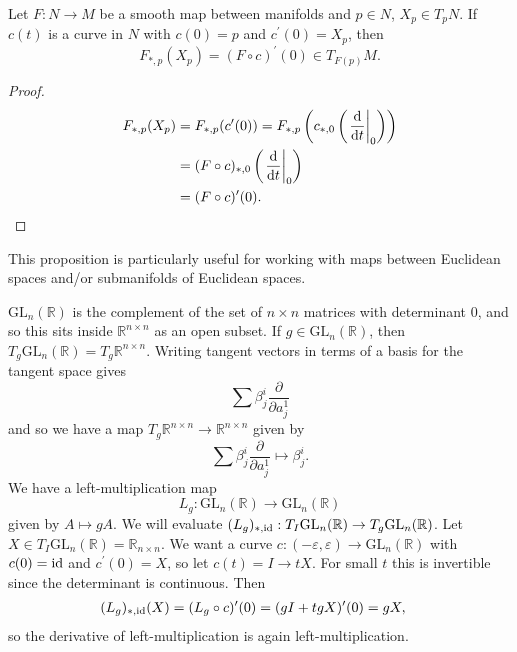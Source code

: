 \begin{prop}
Let $F: N \to M$ be a smooth map between manifolds and
$p \in N$, $X_p \in T_p N$. If $c(t)$ is a curve in $N$ with
$c(0) = p$ and $c^\prime(0) = X_p$, then
$$
  F_{\ast, p}(X_p)
= (F \circ c)^\prime(0) \in T_{F(p)} M.
$$
\end{prop}
\begin{proof}
\begin{align*}
   F_{\ast, p}(X_p)
&= F_{\ast, p}(c^\prime(0))
 = F_{\ast, p}
     \left(
       c_{\ast,0}
       \left(
         \left.\frac{\mathop{}\!\mathrm{d}}{\mathop{}\!\mathrm{d} t}\right|_0
       \right)
     \right) \\
&= (F \circ c)_{\ast, 0}
     \left(
       \left.\frac{\mathop{}\!\mathrm{d}}{\mathop{}\!\mathrm{d} t}\right|_0
     \right) \\
&= (F \circ c)^\prime(0).
\end{align*}
\end{proof}

\begin{remark}
This proposition is particularly useful for working with maps between
Euclidean spaces and/or submanifolds of Euclidean spaces.
\end{remark}

\begin{xmpl}
$\mathrm{GL}_n(\mathbb{R})$ is the complement of the set of $n \times
n$ matrices with determinant 0, and so this sits inside $\mathbb{R}^{n
  \times n}$ as an open subset. If $g \in \mathrm{GL}_n(\mathbb{R})$,
then $T_g \mathrm{GL}_n(\mathbb{R}) = T_g \mathbb{R}^{n \times n}$.
Writing tangent vectors in terms of a basis for the tangent space gives
$$
\sum
  \beta^i_j \frac{\partial}{\partial a^1_j}
$$
and so we have a map
$T_g \mathbb{R}^{n \times n} \to \mathbb{R}^{n \times n}$ given by
$$
\sum
  \beta^i_j \frac{\partial}{\partial a^1_j}
\mapsto
  \beta^i_j.
$$
We have a left-multiplication map
$$
L_g: \mathrm{GL}_n(\mathbb{R}) \to \mathrm{GL}_n(\mathbb{R})
$$
given by $A \mapsto gA$. We will evaluate
$(L_g)_{\ast, \mathrm{id}} : T_I \mathrm{GL}_n(\mathbb{R}) \to T_g \mathrm{GL}_n(\mathbb{R})$.
Let $X \in T_I \mathrm{GL}_n(\mathbb{R}) = \mathbb{R}_{n \times
  n}$. We want a curve
$c: (-\varepsilon, \varepsilon) \to \mathrm{GL}_n(\mathbb{R})$ with
$c(0) = \mathrm{id}$ and $c^\prime(0) = X$, so let $c(t) = I \to t X$. For
small $t$ this is invertible since the determinant is continuous. Then
\begin{align*}
   (L_g)_{\ast, \mathrm{id}}(X)
&= (L_g \circ c)^\prime(0)
 = (gI + tgX)^\prime(0)
 = gX,
\end{align*}
so the derivative of left-multiplication is again left-multiplication.
\end{xmpl}
